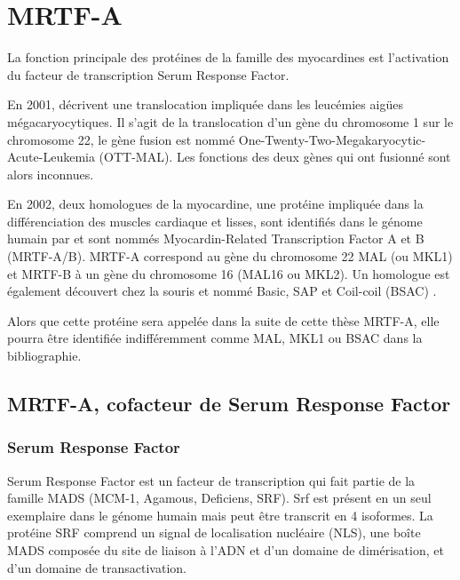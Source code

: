 %
%
%
\chapter{MRTF-A}
La fonction principale des protéines de la famille des myocardines est l'activation du facteur de transcription Serum Response Factor. 

En 2001, \cite{mercher_involvement_2001} 
décrivent une translocation impliquée dans les leucémies aigües mégacaryocytiques. 
Il s'agit de la translocation d'un gène du chromosome 1 sur le chromosome 22, le gène fusion est nommé One-Twenty-Two-Megakaryocytic-Acute-Leukemia (OTT-MAL). 
Les fonctions des deux gènes qui ont fusionné sont alors inconnues. 

En 2002, deux homologues de la myocardine, une protéine impliquée dans la différenciation des muscles cardiaque et lisses, sont identifiés dans le génome humain par \cite{wang_potentiation_2002} et sont nommés Myocardin-Related Transcription Factor A et B (MRTF-A/B).
MRTF-A correspond au gène du chromosome 22 MAL (ou MKL1) et MRTF-B à un gène du chromosome 16 (MAL16 ou MKL2). 
Un homologue est également découvert chez la souris et nommé Basic, SAP et Coil-coil (BSAC) \parencite{sasazuki_identification_2002}. 

Alors que cette protéine sera appelée dans la suite de cette thèse MRTF-A, elle pourra être identifiée indifféremment comme MAL, MKL1 ou BSAC dans la bibliographie. 

\section{MRTF-A, cofacteur de Serum Response Factor}



\subsection{Serum Response Factor}

Serum Response Factor est un facteur de transcription qui fait partie de la famille MADS (MCM-1, Agamous, Deficiens, SRF). Srf est présent en un seul exemplaire dans le génome humain mais peut être transcrit en 4 isoformes. 
La protéine SRF comprend un signal de localisation nucléaire (NLS), une boîte MADS composée du site de liaison à l'ADN et d'un domaine de dimérisation, et d'un domaine de transactivation. 

